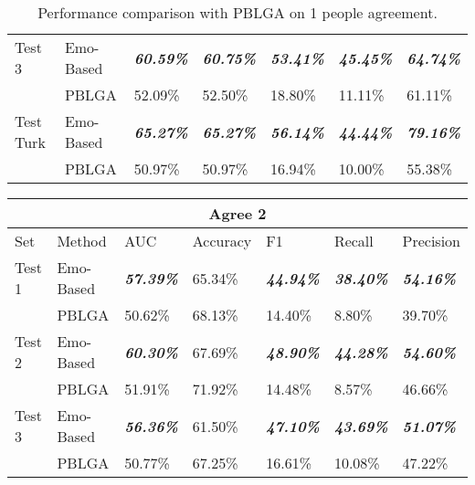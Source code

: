 \documentclass[12pt,a4paper]{report}
\theoremstyle{definition}
\begin{document}
\begin{CJK}{UTF8}{bsmi}
\begin{table}[H]
\begin{tabular}{l | | l | l | l | l | l | l}
                \hline
                Test 3 & Emo-Based & \textit{\textbf{60.59\%}} & \textit{\textbf{60.75\%}} & \textit{\textbf{53.41\%}} & \textit{\textbf{45.45\%}} & \textit{\textbf{64.74\%}}\\
                 & PBLGA & 52.09\% & 52.50\% & 18.80\% & 11.11\% & 61.11\%\\
                
                \hline
                Test Turk & Emo-Based & \textit{\textbf{65.27\%}} & \textit{\textbf{65.27\%}} & \textit{\textbf{56.14\%}} & \textit{\textbf{44.44\%}} & \textit{\textbf{79.16\%}}\\
                 & PBLGA & 50.97\% & 50.97\% & 16.94\% & 10.00\% & 55.38\%\\
                
                \hline
            \end{tabular}
            \caption{Performance comparison with PBLGA on 1 people agreement.}
            \label{tab:pblga_agree1}
        \end{table}
        \begin{table}[H]
            \centering
            \begin{tabular}{l | l | l | l | l | l | l}
                \hline
                \multicolumn{7}{c}{\textbf{Agree 2}} \\
                \hline
                Set & Method & AUC & Accuracy & F1 & Recall & Precision \\
                \hline \hline
                Test 1 & Emo-Based & \textit{\textbf{57.39\%}} & 65.34\% & \textit{\textbf{44.94\%}} & \textit{\textbf{38.40\%}} & \textit{\textbf{54.16\%}}\\
                 & PBLGA & 50.62\% & 68.13\% & 14.40\% & 8.80\% & 39.70\%\\
                
                \hline
                Test 2 & Emo-Based & \textit{\textbf{60.30\%}} & 67.69\% & \textit{\textbf{48.90\%}} & \textit{\textbf{44.28\%}} & \textit{\textbf{54.60\%}}\\
                 & PBLGA & 51.91\% & 71.92\% & 14.48\% & 8.57\% & 46.66\%\\
                
                \hline
                Test 3 & Emo-Based & \textit{\textbf{56.36\%}} & 61.50\% & \textit{\textbf{47.10\%}} & \textit{\textbf{43.69\%}} & \textit{\textbf{51.07\%}}\\
                 & PBLGA & 50.77\% & 67.25\% & 16.61\% & 10.08\% & 47.22\%\\
                

\end{tabular}
\end{table}
\end{CJK}
\end{document}
